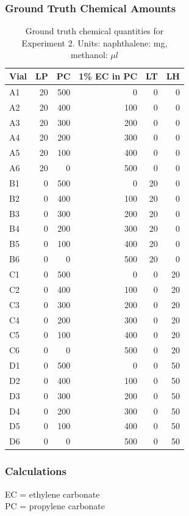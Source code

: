 \documentclass[sn-nature, twocolumn]{sn-jnl}%
\theoremstyle{thmstyleone}%
\theoremstyle{thmstyletwo}%
\theoremstyle{thmstylethree}%
\begin{document}
\subsubsection*{Ground Truth Chemical Amounts}
\begin{table}[!htb]
    \centering
    \scriptsize
    \begin{tabular}{lrrrrr}
    \toprule
    Vial & LP & PC & 1\% EC in PC & LT & LH \\
    \midrule
    A1 & 20 & 500 & 0 & 0 & 0 \\
    A2 & 20 & 400 & 100 & 0 & 0 \\
    A3 & 20 & 300 & 200 & 0 & 0 \\
    A4 & 20 & 200 & 300 & 0 & 0 \\
    A5 & 20 & 100 & 400 & 0 & 0 \\
    A6 & 20 & 0 & 500 & 0 & 0 \\
    B1 & 0 & 500 & 0 & 20 & 0 \\
    B2 & 0 & 400 & 100 & 20 & 0 \\
    B3 & 0 & 300 & 200 & 20 & 0 \\
    B4 & 0 & 200 & 300 & 20 & 0 \\
    B5 & 0 & 100 & 400 & 20 & 0 \\
    B6 & 0 & 0 & 500 & 20 & 0 \\
    C1 & 0 & 500 & 0 & 0 & 20 \\
    C2 & 0 & 400 & 100 & 0 & 20 \\
    C3 & 0 & 300 & 200 & 0 & 20 \\
    C4 & 0 & 200 & 300 & 0 & 20 \\
    C5 & 0 & 100 & 400 & 0 & 20 \\
    C6 & 0 & 0 & 500 & 0 & 20 \\
    D1 & 0 & 500 & 0 & 0 & 50 \\
    D2 & 0 & 400 & 100 & 0 & 50 \\
    D3 & 0 & 300 & 200 & 0 & 50 \\
    D4 & 0 & 200 & 300 & 0 & 50 \\
    D5 & 0 & 100 & 400 & 0 & 50 \\
    D6 & 0 & 0 & 500 & 0 & 50 \\
    \bottomrule
    \end{tabular}
    \caption{Ground truth chemical quantities for Experiment 2. Units: naphthalene: mg, methanol: $\mu l$}
    \label{tab:placeholder}
\end{table}

\subsubsection*{Calculations}
EC = ethylene carbonate \\
PC = propylene carbonate  \\
\end{document}
